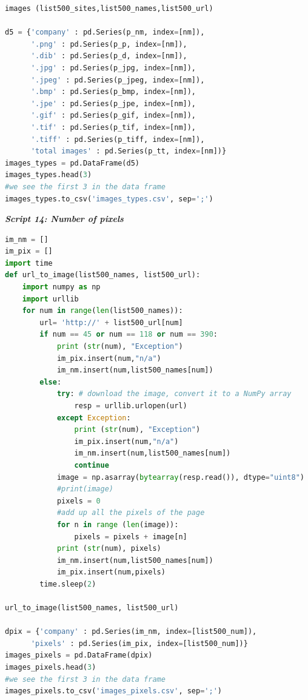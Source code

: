 \documentclass{book}
\begin{document}
\begin{lstlisting}[language=Python]
images (list500_sites,list500_names,list500_url)

d5 = {'company' : pd.Series(p_nm, index=[nm]),
      '.png' : pd.Series(p_p, index=[nm]),
      '.dib' : pd.Series(p_d, index=[nm]),
      '.jpg' : pd.Series(p_jpg, index=[nm]),
      '.jpeg' : pd.Series(p_jpeg, index=[nm]),
      '.bmp' : pd.Series(p_bmp, index=[nm]),
      '.jpe' : pd.Series(p_jpe, index=[nm]),
      '.gif' : pd.Series(p_gif, index=[nm]),
      '.tif' : pd.Series(p_tif, index=[nm]),
      '.tiff' : pd.Series(p_tiff, index=[nm]), 
      'total images' : pd.Series(p_tt, index=[nm])}
images_types = pd.DataFrame(d5)
images_types.head(3) 
#we see the first 3 in the data frame
images_types.to_csv('images_types.csv', sep=';')    
\end{lstlisting}

\begin{center}
\textit{\textbf{Script 14: Number of pixels}}\label{p14}
\end{center}
\begin{lstlisting}[language=Python]
im_nm = []
im_pix = []    
import time
def url_to_image(list500_names, list500_url):
    import numpy as np
    import urllib
    for num in range(len(list500_names)):
        url= 'http://' + list500_url[num]
        if num == 45 or num == 118 or num == 390:
            print (str(num), "Exception")
            im_pix.insert(num,"n/a")
            im_nm.insert(num,list500_names[num]) 
        else:
            try: # download the image, convert it to a NumPy array 
                resp = urllib.urlopen(url)
            except Exception:
                print (str(num), "Exception")
                im_pix.insert(num,"n/a")
                im_nm.insert(num,list500_names[num]) 
                continue
            image = np.asarray(bytearray(resp.read()), dtype="uint8")
            #print(image)
            pixels = 0
            #add up all the pixels of the page
            for n in range (len(image)):
                pixels = pixels + image[n]
            print (str(num), pixels)
            im_nm.insert(num,list500_names[num])            
            im_pix.insert(num,pixels)
        time.sleep(2)
        
url_to_image(list500_names, list500_url) 

dpix = {'company' : pd.Series(im_nm, index=[list500_num]),
      'pixels' : pd.Series(im_pix, index=[list500_num])}
images_pixels = pd.DataFrame(dpix)    
images_pixels.head(3) 
#we see the first 3 in the data frame
images_pixels.to_csv('images_pixels.csv', sep=';')
\end{lstlisting} 
\end{document}
